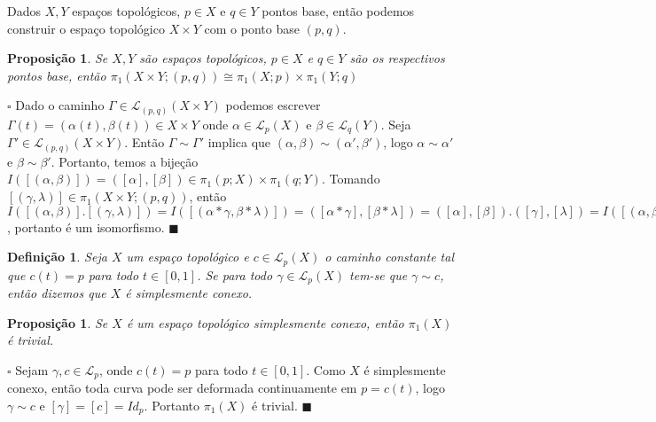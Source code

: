 \documentclass[12pt]{book}
\newtheorem{definicao}[teorema]{Definição}
\newtheorem{proposicao}[teorema]{Proposição}
\newenvironment{prova}[1]{$\square$ #1}{\hfill$\blacksquare$}
\newcommand{\caminhos}{\mathcal{L}}
\newcommand{\caminhospontobase}[1]{\caminhos_{#1}}
\newcommand{\caminhospontobasegeral}[2]{\caminhos_{#1}(#2)}
\newcommand{\classe}[1]{[#1]}
\newcommand{\grupofundamental}[1]{\pi_{1}(#1)}
\newcommand{\grupofundamentalpontobase}[2]{\pi_{1}(#1; #2)}
\newcommand{\intervalo}{[0,1]}
\begin{document}
	Dados $X, Y$ espaços topológicos, $p\in X$ e $q\in Y$ pontos base, então podemos construir o espaço topológico $X\times Y$ com o ponto base $(p,q)$.
	
	\begin{proposicao}\label{proposicao_produto_grupo_fundamental}
		Se $X, Y$ são espaços topológicos, $p\in X$ e $q\in Y$ são os respectivos pontos base, então $\grupofundamentalpontobase{X\times Y}{(p,q)} \cong \grupofundamentalpontobase{X}{p}\times \grupofundamentalpontobase{Y}{q}$
	\end{proposicao}
	\begin{prova}
		Dado o caminho $\Gamma \in \caminhospontobasegeral{(p,q)}{X\times Y}$ podemos escrever $\Gamma(t) = (\alpha(t), \beta(t)) \in X\times Y$ onde $\alpha \in \caminhospontobasegeral{p}{X}$ e $\beta \in \caminhospontobasegeral{q}{Y}$. Seja $\Gamma' \in \caminhospontobasegeral{(p,q)}{X\times Y}$. Então $\Gamma \sim \Gamma'$ implica que $ (\alpha, \beta) \sim (\alpha', \beta')$, logo $\alpha \sim \alpha'$ e $\beta \sim \beta'$. Portanto, temos a bijeção $I(\classe{ (\alpha, \beta)}) =  (\classe{\alpha}, \classe{\beta}) \in \grupofundamentalpontobase{p}{X}\times \grupofundamentalpontobase{q}{Y}$. Tomando $\classe{(\gamma, \lambda)} \in \grupofundamentalpontobase{X\times Y}{(p,q)}$, então $I(\classe{(\alpha, \beta)} .\classe{(\gamma, \lambda)} ) = I(\classe{(\alpha*\gamma, \beta*\lambda)} ) = (\classe{\alpha*\gamma}, \classe{\beta*\lambda})=(\classe{\alpha}, \classe{\beta}) .(\classe{\gamma}, \classe{\lambda}) = I(\classe{(\alpha, \beta)} ).I(\classe{(\gamma, \lambda)} )$, portanto é um isomorfismo.
	\end{prova}
	
	\begin{definicao}
		Seja $X$ um espaço topológico e
		$c \in \caminhospontobasegeral{p}{X}$ o caminho constante tal que $c(t) = p$ para todo $t \in \intervalo$. Se para todo $\gamma \in \caminhospontobasegeral{p}{X}$ tem-se que $\gamma \sim c$, então dizemos que $X$ é simplesmente conexo.
	\end{definicao}
	
	\begin{proposicao}\label{proposicao_grupo_fundamental_simplesmente_conexo}
		Se $X$ é um espaço topológico simplesmente conexo, então $\grupofundamental{X}$ é trivial.
	\end{proposicao}
	\begin{prova}
		Sejam $\gamma, c \in \caminhospontobase{p}$, onde $c(t)=p$ para todo $t\in \intervalo$. Como $X$ é simplesmente conexo, então toda curva pode ser deformada continuamente em $p=c(t)$, logo $\gamma \sim c$ e $\classe{\gamma} = \classe{c} = Id_{p}$. Portanto $\grupofundamental{X}$ é trivial.
	\end{prova}
	
\end{document}
